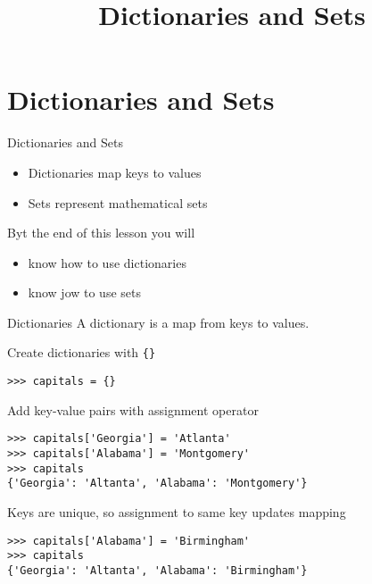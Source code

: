 \documentclass[smaller, aspectratio=1610]{beamer}
\date{}
\title{Dictionaries and Sets}
\begin{document}
\maketitle

\section{Dictionaries and Sets}
\label{sec:org2476c9a}

\begin{frame}[label={sec:orgd65daaa}]{Dictionaries and Sets}
\begin{itemize}
\item Dictionaries map keys to values
\item Sets represent mathematical sets
\end{itemize}

Byt the end of this lesson you will

\begin{itemize}
\item know how to use dictionaries
\item know jow to use sets
\end{itemize}
\end{frame}

\begin{frame}[label={sec:orgc3f7401},fragile]{Dictionaries}
 A dictionary is a map from keys to values.

Create dictionaries with \texttt{\{\}}

\lstset{language=Python,label= ,caption= ,captionpos=b,numbers=none}
\begin{lstlisting}
>>> capitals = {}
\end{lstlisting}

Add key-value pairs with assignment operator

\lstset{language=Python,label= ,caption= ,captionpos=b,numbers=none}
\begin{lstlisting}
>>> capitals['Georgia'] = 'Atlanta'
>>> capitals['Alabama'] = 'Montgomery'
>>> capitals
{'Georgia': 'Altanta', 'Alabama': 'Montgomery'}
\end{lstlisting}

Keys are unique, so assignment to same key updates mapping

\lstset{language=Python,label= ,caption= ,captionpos=b,numbers=none}
\begin{lstlisting}
>>> capitals['Alabama'] = 'Birmingham'
>>> capitals
{'Georgia': 'Altanta', 'Alabama': 'Birmingham'}
\end{lstlisting}
\end{frame}
\end{document}

